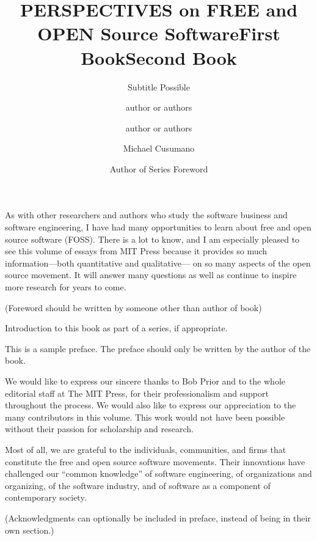 \documentclass{mitpress}
\title{PERSPECTIVES on FREE and OPEN Source Software}
\subtitle{Subtitle Possible}
\title{First Book}
\author{author or authors}
\title{Second Book}
\author{author or authors}
\begin{document}

\titlepages 


\begin{foreword}
\author{Michael Cusumano}

As with other researchers and authors who study the software business
and software engineering, I have had many opportunities to learn about
free and open source software (FOSS). There is a lot to know, and I am
especially pleased to see this volume of essays from MIT Press because
it provides so much information---both quantitative and qualitative---%
on so many aspects of the open source movement. It will answer many
questions as well as continue to inspire more research for years to
come.


(Foreword should be written by someone other than author of book)
\end{foreword}

\begin{seriesforeword}
\author{Author of Series Foreword}

Introduction to this book as part of a series, if appropriate.
\end{seriesforeword}

\begin{preface}
This is a sample preface. The preface should only
be written by the author of the book.

\end{preface}


\begin{acknowledgment}
We would like to express our sincere thanks to Bob Prior and to the whole
editorial staff at The MIT Press, for their professionalism and support
throughout the process. We would also like to express our appreciation to
the many contributors in this volume. This work would not have been possible
without their passion for scholarship and research.

Most of all, we are grateful to the individuals, communities, and firms
that constitute the free and open source software movements. Their innovations
have challenged our ``common knowledge'' of software engineering,
of organizations and organizing, of the software industry, and of
software as a component of contemporary society.


(Acknowledgments can optionally be included in preface, instead of
being in their own section.)
\end{acknowledgment}
\end{document}
